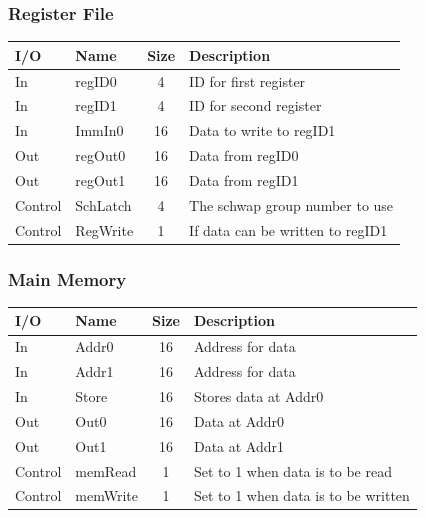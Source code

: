 \documentclass{article}
\begin{document}
		\subsubsection{Register File}
			\begin{center} \begin{tabular}{| l | l | c | l |} \hline
				I/O & Name       & Size & Description \\ \hline 
				In  & regID0     & 4    & ID for first register \\ \hline
				In  & regID1     & 4    & ID for second register \\ \hline
				In  & ImmIn0     & 16   & Data to write to regID1 \\ \hline
				Out & regOut0    & 16   & Data from regID0 \\ \hline
				Out & regOut1    & 16   & Data from regID1 \\ \hline
				Control & SchLatch & 4  & The schwap group number to use\\ \hline
				Control & RegWrite & 1  & If data can be written to regID1\\ \hline
			\end{tabular} \end{center}
		\subsubsection{Main Memory}
			\begin{center} \begin{tabular}{| l | l | c | l |} \hline 
				I/O & Name  & Size & Description \\ \hline 
				In  & Addr0 & 16   & Address for data\\ \hline
				In  & Addr1 & 16   & Address for data\\ \hline
				In  & Store & 16   & Stores data at Addr0\\ \hline
				Out & Out0  & 16   & Data at Addr0 \\ \hline
				Out & Out1  & 16   & Data at Addr1 \\ \hline
				Control & memRead  & 1 & Set to 1 when data is to be read\\ \hline
				Control & memWrite & 1 & Set to 1 when data is to be written\\ \hline
			\end{tabular} \end{center}
\end{document}
